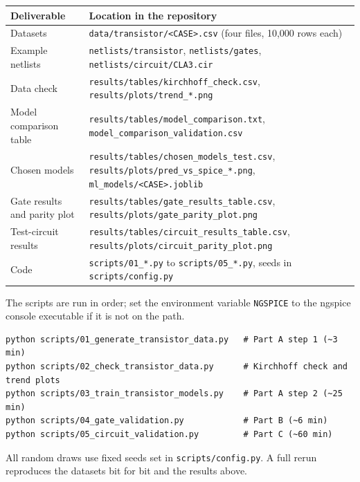 \documentclass[10pt]{article}
\begin{document}
\begin{table}[H]
\centering
\small
\begin{tabularx}{\textwidth}{@{}p{4.2cm}L@{}}
\toprule
Deliverable & Location in the repository \\
\midrule
Datasets & \texttt{data/transistor/<CASE>.csv} (four files, 10,000 rows each) \\
Example netlists & \texttt{netlists/transistor}, \texttt{netlists/gates}, \texttt{netlists/circuit/CLA3.cir} \\
Data check & \texttt{results/tables/kirchhoff\_check.csv}, \texttt{results/plots/trend\_*.png} \\
Model comparison table & \texttt{results/tables/model\_comparison.txt}, \texttt{model\_comparison\_validation.csv} \\
Chosen models & \texttt{results/tables/chosen\_models\_test.csv}, \texttt{results/plots/pred\_vs\_spice\_*.png}, \texttt{ml\_models/<CASE>.joblib} \\
Gate results and parity plot & \texttt{results/tables/gate\_results\_table.csv}, \texttt{results/plots/gate\_parity\_plot.png} \\
Test-circuit results & \texttt{results/tables/circuit\_results\_table.csv}, \texttt{results/plots/circuit\_parity\_plot.png} \\
Code & \texttt{scripts/01\_*.py} to \texttt{scripts/05\_*.py}, seeds in \texttt{scripts/config.py} \\
\bottomrule
\end{tabularx}
\end{table}

The scripts are run in order; set the environment variable \texttt{NGSPICE} to the ngspice console
executable if it is not on the path.

\begin{verbatim}
python scripts/01_generate_transistor_data.py   # Part A step 1 (~3 min)
python scripts/02_check_transistor_data.py      # Kirchhoff check and trend plots
python scripts/03_train_transistor_models.py    # Part A step 2 (~25 min)
python scripts/04_gate_validation.py            # Part B (~6 min)
python scripts/05_circuit_validation.py         # Part C (~60 min)
\end{verbatim}

All random draws use fixed seeds set in \texttt{scripts/config.py}. A full rerun reproduces the
datasets bit for bit and the results above.

\end{document}
